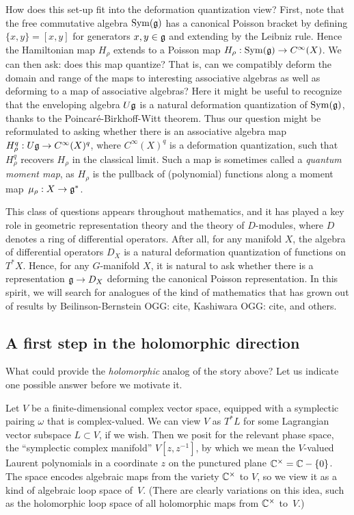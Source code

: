 \documentclass[11pt]{amsart}
\def\owen#1{{\textcolor{green!65!black}{OGG: {#1}}}}
\begin{document}
How does this set-up fit into the deformation quantization view?
First, note that the free commutative algebra $\operatorname{Sym}(\mathfrak g)$ has a canonical Poisson bracket by defining $ \{x, y \}   = [x, y]$ for generators $x, y \in \mathfrak g$ and extending by the Leibniz rule.
Hence the Hamiltonian map $H_\rho$ extends to a Poisson map $H_\rho: \operatorname{Sym}(\mathfrak g) \to C^\infty(X)$.
We can then ask: does this map quantize? That is, can we compatibly deform the domain and range of the maps to interesting associative algebras as well as deforming to a map of associative algebras?
Here it might be useful to recognize that the enveloping algebra $U\mathfrak g$ is a natural deformation quantization of $\operatorname{Sym}(\mathfrak g)$, thanks to the Poincar\'e-Birkhoff-Witt theorem.
Thus our question might be reformulated to asking whether there is an associative algebra map $H^q_\rho: U\mathfrak g \to C^\infty(X)^q$, where $C^\infty(X)^q$ is a deformation quantization, such that $H^q_\rho$ recovers $H_\rho$ in the classical limit.
Such a map is sometimes called a {\em quantum moment map},
as $H_\rho$ is the pullback of (polynomial) functions along a moment map~$\mu_\rho: X \to \mathfrak g^*$.

This class of questions appears throughout mathematics,
and it has played a key role in geometric representation theory and the theory of $D$-modules, where $D$ denotes a ring of differential operators.
After all, for any manifold $X$, the algebra of differential operators $D_X$ is a natural deformation quantization of functions on $T^* X$.
Hence, for any $G$-manifold $X$, it is natural to ask whether there is a representation $\mathfrak g \to D_X$ deforming the canonical Poisson representation.
In this spirit, we will search for analogues of the kind of mathematics that has grown out of results by Beilinson-Bernstein \owen{cite}, Kashiwara \owen{cite}, and others.

\subsection{A first step in the holomorphic direction}

What could provide the {\em holomorphic} analog of the story above?
Let us indicate one possible answer before we motivate it.

Let $V$ be a finite-dimensional complex vector space, equipped with a symplectic pairing $\omega$ that is complex-valued.
We can view $V$ as $T^* L$ for some Lagrangian vector subspace $L \subset V$, if we wish.
Then we posit for the relevant phase space, the ``symplectic complex manifold'' $V[z,z^{-1}]$,
by which we mean the $V$-valued Laurent polynomials in a coordinate $z$ on the punctured plane $\mathbb C^\times = \mathbb C -\{0\}$.
The space encodes algebraic maps from the variety $\mathbb C^\times$ to $V$,
so we view it as a kind of algebraic loop space of~$V$.
(There are clearly variations on this idea, such as the holomorphic loop space of all holomorphic maps from $\mathbb C^\times$ to~$V$.)
\end{document}
